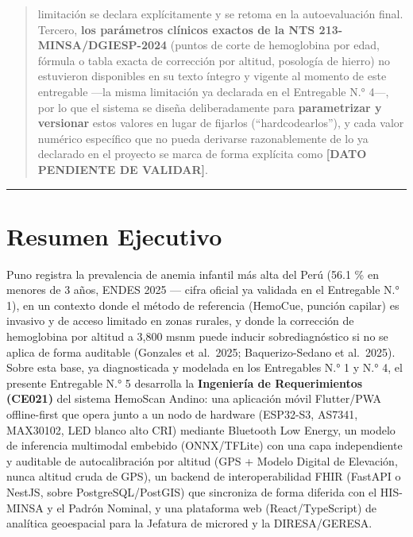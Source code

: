 \documentclass[11pt,a4paper]{article}
\begin{document}
\begin{quote}
limitación se declara explícitamente y se retoma en la autoevaluación final. Tercero, \textbf{los parámetros clínicos exactos de la NTS 213-MINSA/DGIESP-2024} (puntos de corte de hemoglobina por edad, fórmula o tabla exacta de corrección por altitud, posología de hierro) no estuvieron disponibles en su texto íntegro y vigente al momento de este entregable ---la misma limitación ya declarada en el Entregable N.° 4---, por lo que el sistema se diseña deliberadamente para \textbf{parametrizar y versionar} estos valores en lugar de fijarlos (``hardcodearlos''), y cada valor numérico específico que no pueda derivarse razonablemente de lo ya declarado en el proyecto se marca de forma explícita como \textbf{{[}DATO PENDIENTE DE VALIDAR{]}}.
\end{quote}

\begin{center}\rule{0.5\linewidth}{0.5pt}\end{center}

\section{Resumen Ejecutivo}\label{resumen-ejecutivo}

Puno registra la prevalencia de anemia infantil más alta del Perú (56.1 \% en menores de 3 años, ENDES 2025 --- cifra oficial ya validada en el Entregable N.° 1), en un contexto donde el método de referencia (HemoCue, punción capilar) es invasivo y de acceso limitado en zonas rurales, y donde la corrección de hemoglobina por altitud a 3,800 msnm puede inducir sobrediagnóstico si no se aplica de forma auditable (Gonzales et al.~2025; Baquerizo-Sedano et al.~2025). Sobre esta base, ya diagnosticada y modelada en los Entregables N.° 1 y N.° 4, el presente Entregable N.° 5 desarrolla la \textbf{Ingeniería de Requerimientos (CE021)} del sistema HemoScan Andino: una aplicación móvil Flutter/PWA offline-first que opera junto a un nodo de hardware (ESP32-S3, AS7341, MAX30102, LED blanco alto CRI) mediante Bluetooth Low Energy, un modelo de inferencia multimodal embebido (ONNX/TFLite) con una capa independiente y auditable de autocalibración por altitud (GPS + Modelo Digital de Elevación, nunca altitud cruda de GPS), un backend de interoperabilidad FHIR (FastAPI o NestJS, sobre PostgreSQL/PostGIS) que sincroniza de forma diferida con el HIS-MINSA y el Padrón Nominal, y una plataforma web (React/TypeScript) de analítica geoespacial para la Jefatura de microred y la DIRESA/GERESA.
\end{document}
